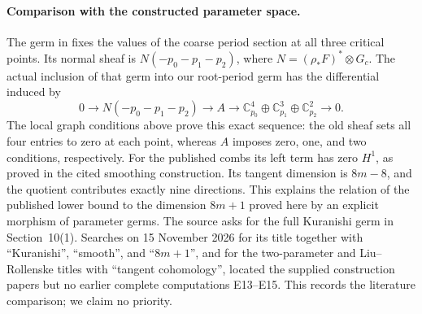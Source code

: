 \paragraph{Comparison with the constructed parameter space.}
The germ in \cite[Lemma labelled \texttt{paramspace} and
Proposition labelled \texttt{effective}]{Viaclovsky2026Combs}
fixes the values of the coarse period section at all three
critical points. Its normal sheaf is $N(-p_0-p_1-p_2)$, where
$N=(\rho_*F)^*\otimes G_c$. The actual inclusion of that germ
into our root-period germ has the differential induced by
\[
0\longrightarrow N(-p_0-p_1-p_2)\longrightarrow A
\longrightarrow
 \mathbb C_{p_0}^{4}\oplus\mathbb C_{p_1}^{3}
                     \oplus\mathbb C_{p_2}^{2}
\longrightarrow0.
\]
The local graph conditions above prove this exact sequence:
the old sheaf sets all four entries to zero at each point,
whereas $A$ imposes zero, one, and two conditions, respectively.
For the published combs its left term has zero $H^1$, as proved
in the cited smoothing construction. Its tangent dimension is
$8m-8$, and the quotient contributes exactly nine directions.
This explains the relation of the published lower bound to the
dimension $8m+1$ proved here by an explicit morphism of parameter
germs. The source asks for the full Kuranishi germ in
Section~10(1). Searches on 15 November 2026 for its title together
with ``Kuranishi'', ``smooth'', and ``$8m+1$'', and for the
two-parameter and Liu--Rollenske titles with ``tangent cohomology'',
located the supplied construction papers but no earlier complete
computations E13--E15. This records the literature comparison;
we claim no priority.



